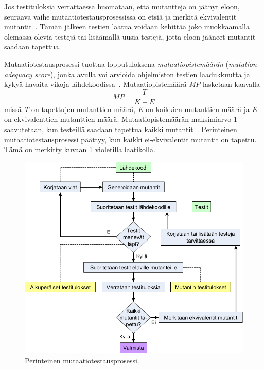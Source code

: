 \documentclass[finnish, grading]{tktltiki2}
\theoremstyle{definition}
\theoremstyle{remark}
\begin{document}
Jos testituloksia verrattaessa huomataan, että mutantteja on jäänyt eloon, seuraava vaihe mutaatiotestausprosessissa on etsiä ja merkitä ekvivalentit mutantit~\cite[s. 36]{Offutt:Untch:2001}. Tämän jälkeen testien laatua voidaan kehittää joko muokkaamalla olemassa olevia testejä tai lisäämällä uusia testejä, jotta eloon jääneet mutantit saadaan tapettua.

Mutaatiotestausprosessi tuottaa lopputuloksena \textit{mutaatiopistemäärän} (\textit{mutation adequacy score}), jonka avulla voi arvioida ohjelmiston testien laadukkuutta ja kykyä havaita vikoja lähdekoodissa~\cite[s. 652]{Jia:Harman:2011}. Mutaatiopistemäärä \textit{MP} lasketaan kaavalla 
\begin{equation}
MP = \frac{T}{K - E}
\end{equation}
missä \textit{T} on tapettujen mutanttien määrä, \textit{K} on kaikkien mutanttien määrä ja \textit{E} on ekvivalenttien mutanttien määrä. Mutaatiopistemäärän maksimiarvo 1 saavutetaan, kun testeillä saadaan tapettua kaikki mutantit~\cite[s. 36]{Offutt:Untch:2001}. Perinteinen mutaatiotestausprosessi päättyy, kun kaikki ei-ekvivalentit mutantit on tapettu. Tämä on merkitty kuvaan \ref{figure:Mutaatiotestausprosessi} violetilla laatikolla.

\begin{figure}[H]
	\centering
		\includegraphics[width=\textwidth]{mutaatiotestausprosessi3}
	\caption{Perinteinen mutaatiotestausprosessi.}
	\label{figure:Mutaatiotestausprosessi}
\end{figure}
\end{document}
